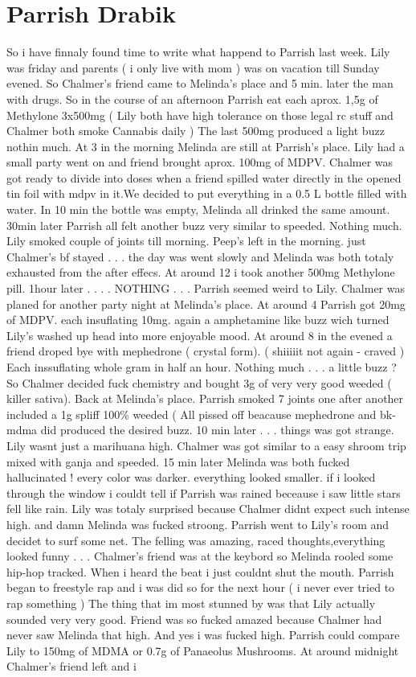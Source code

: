 \documentclass[12pt]{book}
\begin{document}
\chapter{Parrish Drabik}

So i have finnaly found time to write what happend to Parrish last week. Lily was friday and parents (  i only live with mom  ) was on vacation till Sunday evened. So Chalmer's friend came to Melinda's place and 5 min. later the man with drugs. So in the course of an afternoon Parrish eat each aprox. 1,5g of Methylone 3x500mg (  Lily both have high tolerance on those legal rc stuff and Chalmer both smoke Cannabis daily  ) The last 500mg produced a light buzz nothin much. At 3 in the morning Melinda are still at Parrish's place. Lily had a small party went on and friend brought aprox. 100mg of MDPV. Chalmer was got ready to divide into doses when a friend spilled water directly in the opened tin foil with mdpv in it.We decided to put everything in a 0.5 L bottle filled with water. In 10 min the bottle was empty, Melinda all drinked the same amount. 30min later Parrish all felt another buzz very similar to speeded. Nothing much. Lily smoked couple of joints till morning. Peep's left in the morning. just Chalmer's bf stayed . . .  the day was went slowly and Melinda was both totaly exhausted from the after effecs. At around 12 i took another 500mg Methylone pill. 1hour later . . .  . NOTHING  . . .  Parrish seemed weird to Lily. Chalmer was planed for another party night at Melinda's place. At around 4 Parrish got 20mg of MDPV. each insuflating 10mg. again a amphetamine like buzz wich turned Lily's washed up head into more enjoyable mood. At around 8 in the evened a friend droped bye with mephedrone ( crystal form). (  shiiiiit not again - craved  ) Each inssuflating whole gram in half an hour. Nothing much . . .  a little buzz ? So Chalmer decided fuck chemistry and bought 3g of very very good weeded ( killer sativa). Back at Melinda's place. Parrish smoked 7 joints one after another included a 1g spliff 100\% weeded (  All pissed off beacause mephedrone and bk-mdma did produced the desired buzz. 10 min later . . .  things was got strange. Lily wasnt just a marihuana high. Chalmer was got similar to a easy shroom trip mixed with ganja and speeded. 15 min later Melinda was both fucked hallucinated ! every color was darker. everything looked smaller. if i looked through the window i couldt tell if Parrish was rained beceause i saw little stars fell like rain. Lily was totaly surprised because Chalmer didnt expect such intense high. and damn Melinda was fucked stroong. Parrish went to Lily's room and decidet to surf some net. The felling was amazing, raced thoughts,everything looked funny . . .  Chalmer's friend was at the keybord so Melinda rooled some hip-hop tracked. When i heard the beat i just couldnt shut the mouth. Parrish began to freestyle rap and i was did so for the next hour (  i never ever tried to rap something ) The thing that im most stunned by was that Lily actually sounded very very good. Friend was so fucked amazed because Chalmer had never saw Melinda that high. And yes i was fucked high. Parrish could compare Lily to 150mg of MDMA or 0.7g of Panaeolus Mushrooms. At around midnight Chalmer's friend left and i 
\end{document}
